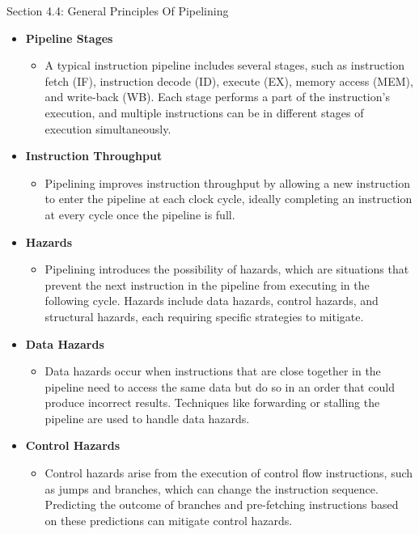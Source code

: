 \begin{notes}{Section 4.4: General Principles Of Pipelining}
    \begin{itemize}
        \item \textbf{Pipeline Stages}
        \begin{itemize}
            \item A typical instruction pipeline includes several stages, such as instruction fetch (IF), instruction decode (ID), execute (EX), memory access (MEM), and write-back (WB). Each stage 
            performs a part of the instruction's execution, and multiple instructions can be in different stages of execution simultaneously.
        \end{itemize}
        \item \textbf{Instruction Throughput}
        \begin{itemize}
            \item Pipelining improves instruction throughput by allowing a new instruction to enter the pipeline at each clock cycle, ideally completing an instruction at every cycle once the pipeline 
            is full.
        \end{itemize}
        \item \textbf{Hazards}
        \begin{itemize}
            \item Pipelining introduces the possibility of hazards, which are situations that prevent the next instruction in the pipeline from executing in the following cycle. Hazards include data 
            hazards, control hazards, and structural hazards, each requiring specific strategies to mitigate.
        \end{itemize}
        \item \textbf{Data Hazards}
        \begin{itemize}
            \item Data hazards occur when instructions that are close together in the pipeline need to access the same data but do so in an order that could produce incorrect results. Techniques like 
            forwarding or stalling the pipeline are used to handle data hazards.
        \end{itemize}
        \item \textbf{Control Hazards}
        \begin{itemize}
            \item Control hazards arise from the execution of control flow instructions, such as jumps and branches, which can change the instruction sequence. Predicting the outcome of branches and 
            pre-fetching instructions based on these predictions can mitigate control hazards.

\end{itemize}
\end{itemize}
\end{notes}
